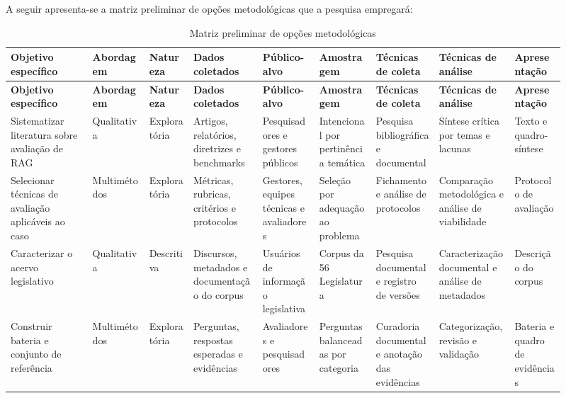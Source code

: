 A seguir apresenta-se a matriz preliminar de opções metodológicas que a pesquisa empregará:

\begin{landscape}
\begingroup
\scriptsize
\setlength{\tabcolsep}{1.5pt}
\begin{longtable}{@{}>{\raggedright\arraybackslash}p{0.13\linewidth}>{\raggedright\arraybackslash}p{0.095\linewidth}>{\raggedright\arraybackslash}p{0.075\linewidth}>{\raggedright\arraybackslash}p{0.115\linewidth}>{\raggedright\arraybackslash}p{0.095\linewidth}>{\raggedright\arraybackslash}p{0.09\linewidth}>{\raggedright\arraybackslash}p{0.105\linewidth}>{\raggedright\arraybackslash}p{0.125\linewidth}>{\raggedright\arraybackslash}p{0.085\linewidth}@{}}
\caption{Matriz preliminar de opções metodológicas}
\label{tab:matriz-metodologica}\\
\toprule
\textbf{Objetivo específico} & \textbf{Abordagem} & \textbf{Natureza} & \textbf{Dados coletados} & \textbf{Público-alvo} & \textbf{Amostragem} & \textbf{Técnicas de coleta} & \textbf{Técnicas de análise} & \textbf{Apresentação} \\
\midrule
\endfirsthead
\toprule
\textbf{Objetivo específico} & \textbf{Abordagem} & \textbf{Natureza} & \textbf{Dados coletados} & \textbf{Público-alvo} & \textbf{Amostragem} & \textbf{Técnicas de coleta} & \textbf{Técnicas de análise} & \textbf{Apresentação} \\
\midrule
\endhead
Sistematizar literatura sobre avaliação de RAG & Qualitativa & Exploratória & Artigos, relatórios, diretrizes e benchmarks & Pesquisadores e gestores públicos & Intencional por pertinência temática & Pesquisa bibliográfica e documental & Síntese crítica por temas e lacunas & Texto e quadro-síntese \\
Selecionar técnicas de avaliação aplicáveis ao caso & Multimétodos & Exploratória & Métricas, rubricas, critérios e protocolos & Gestores, equipes técnicas e avaliadores & Seleção por adequação ao problema & Fichamento e análise de protocolos & Comparação metodológica e análise de viabilidade & Protocolo de avaliação \\
Caracterizar o acervo legislativo & Qualitativa & Descritiva & Discursos, metadados e documentação do corpus & Usuários de informação legislativa & Corpus da 56\textordfeminine{} Legislatura & Pesquisa documental e registro de versões & Caracterização documental e análise de metadados & Descrição do corpus \\
Construir bateria e conjunto de referência & Multimétodos & Exploratória & Perguntas, respostas esperadas e evidências & Avaliadores e pesquisadores & Perguntas balanceadas por categoria & Curadoria documental e anotação das evidências & Categorização, revisão e validação & Bateria e quadro de evidências \\

\end{longtable}
\end{landscape}
